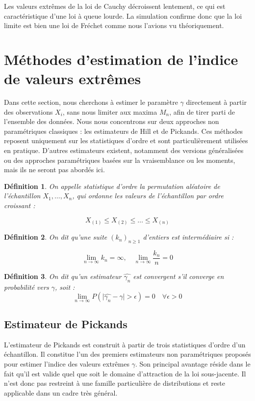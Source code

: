 \documentclass{article}
\theoremstyle{plain}
\newtheorem{definition}{Définition}[section]
\theoremstyle{definition}
\theoremstyle{plain}
\begin{document}
\noindent Les valeurs extrêmes de la loi de Cauchy décroissent lentement, ce qui est caractéristique d'une loi à queue lourde. La simulation confirme donc que la loi limite est bien une loi de Fréchet comme nous l'avions vu théoriquement.

\section{Méthodes d'estimation de l'indice de valeurs extrêmes}
\noindent Dans cette section, nous cherchons à estimer le paramètre \(\gamma\) directement à partir des observations \(X_i\), sans nous limiter aux maxima \(M_n\), afin de tirer parti de l’ensemble des données.  
Nous nous concentrons sur deux approches non paramétriques classiques : les estimateurs de Hill et de Pickands. Ces méthodes reposent uniquement sur les statistiques d’ordre et sont particulièrement utilisées en pratique. D'autres estimateurs existent, notamment des versions généralisées ou des approches paramétriques basées sur la vraisemblance ou les moments, mais ils ne seront pas abordés ici. \\

\begin{definition}
On appelle \textit{statistique d'ordre} la permutation aléatoire de l'échantillon \(X_1, \dots, X_n\), qui ordonne les valeurs de l’échantillon par ordre croissant :

\[
X_{(1)} \leq X_{(2)} \leq \dots \leq X_{(n)}
\]
\end{definition}

\begin{definition}
On dit qu'une suite \((k_n)_{n \geq 1}\) d'entiers est intermédiaire si :

\[
\lim_{n \to \infty} k_n = \infty, \quad \lim_{n \to \infty} \frac{k_n}{n} = 0
\]

\end{definition}


\begin{definition}
On dit qu'un estimateur \(\hat{\gamma_{n}}\) est convergent s'il converge en probabilité vers \(\gamma\), soit :
\[
\lim_{n \to \infty} P(\lvert \hat{\gamma_{n}} - \gamma \rvert > \epsilon) = 0 \quad \forall \epsilon > 0
\]  
\end{definition}

\subsection{Estimateur de Pickands}
L’estimateur de Pickands est construit à partir de trois statistiques d’ordre d'un échantillon. Il constitue l’un des premiers estimateurs non paramétriques proposés pour estimer l’indice des valeurs extrêmes \(\gamma\). Son principal avantage réside dans le fait qu’il est valide quel que soit le domaine d’attraction de la loi sous-jacente. Il n'est donc pas restreint à une famille particulière de distributions et reste applicable dans un cadre très général.
\end{document}
